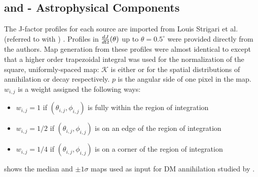 \subsection{\J and \D - Astrophysical Components}\label{sec:mtd_spatialmodel}

The J-factor profiles for each source are imported from Louis Strigari et al. (referred to with \LS) \cite{DM_Strigari20}.
Profiles in $\frac{dJ}{d\Omega} (\theta)$ up to $\theta = 0.5^{\circ}$ were provided directly from the authors.
Map generation from these profiles were almost identical to  except that a higher order trapezoidal integral was used for the normalization of the square, uniformly-spaced map:
\TrapIntegral
$\mathcal{K}$ is either \J or \D for the spatial distributions of annihilation or decay respectively.
$p$ is the angular side of one pixel in the map.
$w_{i,j}$ is a weight assigned the following ways:
\begin{itemize}
    \item[] $w_{i,j} = 1$ if $(\theta_{i,j}, \phi_{i,j})$ is fully within the region of integration
    \item[] $w_{i,j} = 1/2$ if $(\theta_{i,j}, \phi_{i,j})$ is on an edge of the region of integration
    \item[] $w_{i,j} = 1/4$ if $(\theta_{i,j}, \phi_{i,j})$ is on a corner of the region of integration
\end{itemize}
 shows the median and $\pm1\sigma$ maps used as input for DM annihilation studied by \LS.

